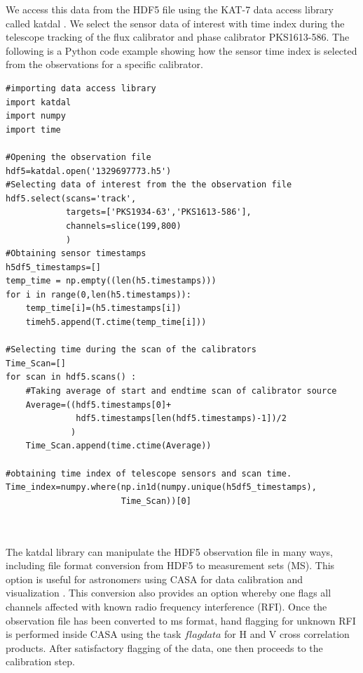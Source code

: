 We access this data from the HDF5 file using the KAT-7 data access library called katdal \citep{skatelescope}. We select the sensor data of interest with time index during the telescope tracking of the flux calibrator and phase calibrator PKS1613-586. The following is a Python code example showing how the sensor time index is selected from the observations for a specific calibrator.

\begin{tcolorbox}
\begin{lstlisting}
#importing data access library
import katdal
import numpy
import time

#Opening the observation file 
hdf5=katdal.open('1329697773.h5')
#Selecting data of interest from the the observation file
hdf5.select(scans='track',
            targets=['PKS1934-63','PKS1613-586'],
            channels=slice(199,800)
            )   
#Obtaining sensor timestamps            
h5df5_timestamps=[]
temp_time = np.empty((len(h5.timestamps)))
for i in range(0,len(h5.timestamps)):
    temp_time[i]=(h5.timestamps[i])
    timeh5.append(T.ctime(temp_time[i]))      
       
#Selecting time during the scan of the calibrators
Time_Scan=[]
for scan in hdf5.scans() :
    #Taking average of start and endtime scan of calibrator source
    Average=((hdf5.timestamps[0]+
              hdf5.timestamps[len(hdf5.timestamps)-1])/2
             ) 
    Time_Scan.append(time.ctime(Average))
    
#obtaining time index of telescope sensors and scan time.
Time_index=numpy.where(np.in1d(numpy.unique(h5df5_timestamps),
                       Time_Scan))[0]
                       
                                           
\end{lstlisting}
\end{tcolorbox}

 The katdal library can manipulate the HDF5 observation file in many ways, including file format conversion from HDF5 to measurement sets (MS). This option is useful for astronomers using CASA for data calibration and visualization \citep{foley2016engineering}. This conversion also provides an option whereby one flags all channels affected with known radio frequency interference (RFI). Once the observation file has been converted to ms format, hand flagging for unknown RFI is performed inside CASA using the task $\textit{flagdata}$ for H and V cross correlation products. After satisfactory flagging of the data, one then proceeds to the calibration step. 
 
